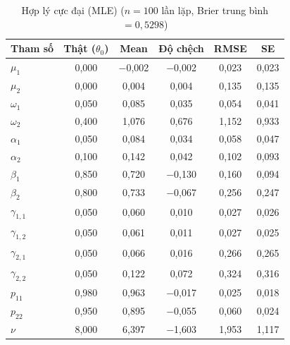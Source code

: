\documentclass[11pt,a4paper]{article}
\begin{document}
\begin{table}[H]\centering\scriptsize
\caption{Hợp lý cực đại (MLE) ($n=100$ lần lặp, Brier trung bình $=0,5298$)}
\begin{tabularx}{\textwidth}{l C C C C C}
\toprule
\textbf{Tham số} & \textbf{Thật ($\theta_0$)} & \textbf{Mean} & \textbf{Độ chệch} & \textbf{RMSE} & \textbf{SE} \\
\midrule
$\mu_1$ & 0,000 & $-$0,002 & $-$0,002 & 0,023 & 0,023 \\
$\mu_2$ & 0,000 & 0,004 & 0,004 & 0,135 & 0,135 \\
$\omega_1$ & 0,050 & 0,085 & 0,035 & 0,054 & 0,041 \\
$\omega_2$ & 0,400 & 1,076 & 0,676 & 1,152 & 0,933 \\
$\alpha_1$ & 0,050 & 0,084 & 0,034 & 0,058 & 0,047 \\
$\alpha_2$ & 0,100 & 0,142 & 0,042 & 0,102 & 0,093 \\
$\beta_1$ & 0,850 & 0,720 & $-$0,130 & 0,160 & 0,094 \\
$\beta_2$ & 0,800 & 0,733 & $-$0,067 & 0,256 & 0,247 \\
$\gamma_{1,1}$ & 0,050 & 0,060 & 0,010 & 0,027 & 0,026 \\
$\gamma_{1,2}$ & 0,050 & 0,061 & 0,011 & 0,027 & 0,025 \\
$\gamma_{2,1}$ & 0,050 & 0,066 & 0,016 & 0,266 & 0,265 \\
$\gamma_{2,2}$ & 0,050 & 0,122 & 0,072 & 0,324 & 0,316 \\
$p_{11}$ & 0,980 & 0,963 & $-$0,017 & 0,025 & 0,018 \\
$p_{22}$ & 0,950 & 0,895 & $-$0,055 & 0,060 & 0,024 \\
$\nu$ & 8,000 & 6,397 & $-$1,603 & 1,953 & 1,117 \\
\bottomrule
\end{tabularx}
\end{table}
\end{document}
